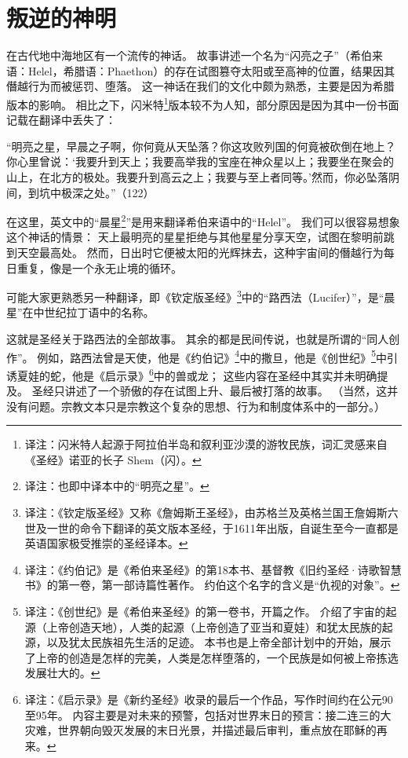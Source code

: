 \chapter{叛逆的神明}
在古代地中海地区有一个流传的神话。
故事讲述一个名为“闪亮之子”（希伯来语：Helel，希腊语：Phaethon）的存在试图篡夺太阳或至高神的位置，结果因其僭越行为而被惩罚、堕落。
这一神话在我们的文化中颇为熟悉，主要是因为希腊版本的影响。
相比之下，闪米特\footnote{%
    译注：闪米特人起源于阿拉伯半岛和叙利亚沙漠的游牧民族，词汇灵感来自《圣经》诺亚的长子 Shem（闪）。
}版本较不为人知，部分原因是因为其中一份书面记载在翻译中丢失了：

“明亮之星，早晨之子啊，你何竟从天坠落？你这攻败列国的何竟被砍倒在地上？你心里曾说：‘我要升到天上；我要高举我的宝座在神众星以上；我要坐在聚会的山上，在北方的极处。我要升到高云之上；我要与至上者同等。’然而，你必坠落阴间，到坑中极深之处。”（122）

在这里，英文中的“晨星\footnote{%
    译注：也即中译本中的“明亮之星”。
}”是用来翻译希伯来语中的``Helel''。
我们可以很容易想象这个神话的情景：
天上最明亮的星星拒绝与其他星星分享天空，试图在黎明前跳到天空最高处。
然而，日出时它便被太阳的光辉抹去，这种宇宙间的僭越行为每日重复，像是一个永无止境的循环。

可能大家更熟悉另一种翻译，即《钦定版圣经》\footnote{%
    译注：《钦定版圣经》又称《詹姆斯王圣经》，由苏格兰及英格兰国王詹姆斯六世及一世的命令下翻译的英文版本圣经，于1611年出版，自诞生至今一直都是英语国家极受推崇的圣经译本。
}中的“路西法（Lucifer）”，是“晨星”在中世纪拉丁语中的名称。

这就是圣经关于路西法的全部故事。
其余的都是民间传说，也就是所谓的“同人创作”。
例如，路西法曾是天使，他是《约伯记》\footnote{%
    译注：《约伯记》是《希伯来圣经》的第18本书、基督教《旧约圣经·诗歌智慧书》的第一卷，第一部诗篇性著作。
    约伯这个名字的含义是“仇视的对象”。
}中的撒旦，他是《创世纪》\footnote{%
    译注：《创世纪》是《希伯来圣经》的第一卷书，开篇之作。
    介绍了宇宙的起源（上帝创造天地），人类的起源（上帝创造了亚当和夏娃）和犹太民族的起源，以及犹太民族祖先生活的足迹。
    本书也是上帝全部计划中的开始，展示了上帝的创造是怎样的完美，人类是怎样堕落的，一个民族是如何被上帝拣选发展壮大的。
}中引诱夏娃的蛇，他是《启示录》\footnote{%
    译注：《启示录》是《新约圣经》收录的最后一个作品，写作时间约在公元90至95年。
    内容主要是对未来的预警，包括对世界末日的预言：接二连三的大灾难，世界朝向毁灭发展的末日光景，并描述最后审判，重点放在耶稣的再来。
}中的兽或龙；
这些内容在圣经中其实并未明确提及。
圣经只讲述了一个骄傲的存在试图上升、最后被打落的故事。
（当然，这并没有问题。宗教文本只是宗教这个复杂的思想、行为和制度体系中的一部分。）

